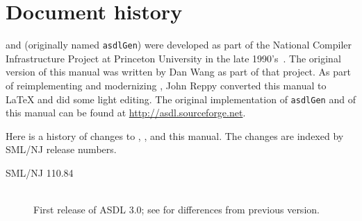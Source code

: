 %
\chapter{Document history}
\label{ch:history}

\asdl{} and \asdlgen{} (originally named \texttt{asdlGen}) were developed as part
of the National Compiler Infrastructure Project at Princeton University in the
late 1990's~\cite{usenix:zephyr-asdl}.
The original version of this manual was written by Dan Wang as part of that project.
As part of reimplementing and modernizing \asdl{}, John Reppy converted this manual
to \LaTeX{} and did some light editing.
The original implementation of \texttt{asdlGen} and of this manual can be
found at \url{http://asdl.sourceforge.net}.

Here is a history of changes to \asdl{}, \asdlgen{}, and this manual.
The changes are indexed by SML/NJ release numbers.

\begin{description}
  \item[SML/NJ 110.84]
    \mbox{}\\[0.5em]
    First release of ASDL 3.0; see  for differences from previous
    version.
\end{description}%
